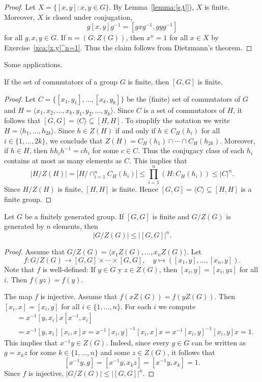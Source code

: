\begin{proof}
	Let $X=\{[x,y]:x,y\in G\}$. By Lemma~\ref{lemma:[s,t]}), $X$ is finite.
	Moreover, $X$ is closed under conjugation, 
	\[
		g[x,y]g^{-1}=[gxg^{-1},gyg^{-1}]
	\]
	for all $g,x,y\in G$. If $n=(G:Z(G))$, then $x^n=1$ for all $x\in X$
	by Exercise~\ref{xca:[x,y]^n=1}. Thus the claim follows from 
	Dietzmann's theorem.
\end{proof}

Some applications. 

\begin{theorem}[Niroomand]
\label{thm:Niroomand}
	If the set of commutators of a group $G$ is finite, then 
	$[G,G]$ is finite.
\end{theorem}

\begin{proof}
 	Let $C=\{[x_1,y_1],\dots,[x_k,y_k]\}$ be the (finite) set of commutators of $G$ and  
	$H=\langle x_1,x_2,\dots,x_k,y_1,y_2,\dots,y_k\rangle$. Since $C$ is a set of commutators of $H$, 
	it follows that 
	$[G,G]=\langle C\rangle\subseteq [H,H]$. To simplify the notation we write 
	$H=\langle h_1,\dots,h_{2k}\rangle$. 	
 	Since $h\in Z(H)$ if and only if $h\in C_H(h_i)$ for all 
	$i\in\{1,\dots,2k\}$, we conclude that $Z(H)=C_H(h_1)\cap\cdots\cap C_H(h_{2k})$. Moreover, if 
	$h\in H$, then $hh_ih^{-1}=ch_i$ for some $c\in C$. Thus the conjugacy class of each 
	$h_i$ contains at most as many elements as $C$. This implies that 
	\[
		|H/Z(H)|=|H/\cap_{i=1}^n C_H(h_i)|\leq\prod_{i=1}^n (H:C_H(h_i))\leq |C|^n.
	\]
	Since $H/Z(H)$ is finite, $[H,H]$ is finite. Hence  
	$[G,G]=\langle C\rangle\subseteq [H,H]$ 
	is a finite group. 
\end{proof}

\begin{theorem}
	\label{thm:HiltonNiroomand}
	Let $G$ be a finitely generated group. If $[G,G]$ is finite and $G/Z(G)$ is generated by
	$n$ elements, then  
	\[
	|G/Z(G)|\leq |[G,G]|^n. 
	\]
\end{theorem}

\begin{proof}
	Assume that $G/Z(G)=\langle x_1Z(G),\dots,x_nZ(G)\rangle$. Let 
	\[
		f\colon G/Z(G)\to [G,G]\times\cdots\times [G,G],
		\quad
		y\mapsto ([x_1,y],\dots,[x_n,y]).
	\]
	Note that $f$ is well-defined: If $y\in G$ y $z\in Z(G)$, then $[x_i,y]=[x_i,yz]$ for all $i$. 
	Then $f(yz)=f(y)$.
	 
	The map $f$ is injective. Assume that $f(xZ(G))=f(yZ(G))$. Then 
	$[x_i,x]=[x_i,y]$ for all $i\in\{1,\dots,n\}$. For each $i$ we compute  
	\begin{align*}
		[x^{-1}y,x_i] &= x^{-1}[y,x_i]x[x^{-1},x_i]\\
		&=x^{-1}[y,x_i][x_i,x]x=x^{-1}[x_i,y]^{-1}[x_i,x]x=x^{-1}[x_i,y]^{-1}[x_i,y]x=1.
	\end{align*}
	This implies that $x^{-1}y\in Z(G)$. Indeed, since  
	every $g\in G$ can be written as $g=x_kz$ for some $k\in\{1,\dots,n\}$ and some $z\in Z(G)$, 
	it follows that 
    \[
    [x^{-1}y,g]=[x^{-1}y,x_kz]=[x^{-1}y,x_k]=1.
    \]
    Since $f$ is injective, 
	$|G/Z(G)|\leq |[G,G]|^n$. 
\end{proof}

